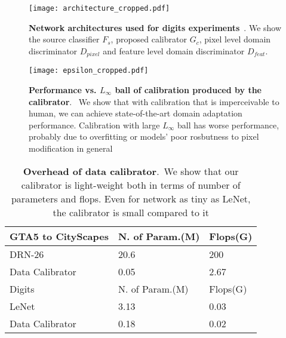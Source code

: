 





\begin{figure*}[!htp]
\centering
\texttt{[image: architecture\_cropped.pdf]}
\caption{\textbf{Network architectures used for digits experiments}~. We show the source classifier $F_s$, proposed calibrator $G_c$, pixel level domain discriminator $D_{pixel}$ and feature level domain discriminator $D_{feat}$.
}
\label{fig:architecture}
\end{figure*}


\begin{figure*}[!htp]
\centering
\texttt{[image: epsilon\_cropped.pdf]}
\caption{\textbf{Performance vs. $L_{\infty}$ ball of calibration produced by the calibrator}.~ We show that with calibration that is imperceivable to human, we can achieve state-of-the-art domain adaptation performance. Calibration with large  $L_{\infty}$ ball has worse performance, probably due to overfitting or models' poor rosbutness to pixel modification in general
}
\label{fig:epsilon}
\end{figure*}



\begin{table*}[!htp]
\centering
\begin{tabular}{lll}
\hline
GTA5 to CityScapes & N. of Param.(M) & Flops(G) \\ \hline
DRN-26 & 20.6 & 200 \\
Data Calibrator & 0.05 & 2.67 \\ \hline
Digits & N. of Param.(M) & Flops(G) \\ \hline
LeNet & 3.13 & 0.03 \\
Data Calibrator & 0.18 & 0.02 \\ \hline
\end{tabular}
\caption{\textbf{Overhead of data calibrator}.~We show that our calibrator is light-weight both in terms of number of parameters and flops. Even for network as tiny as LeNet, the calibrator is small compared to it}
\label{table:overhead}
\end{table*}









%
